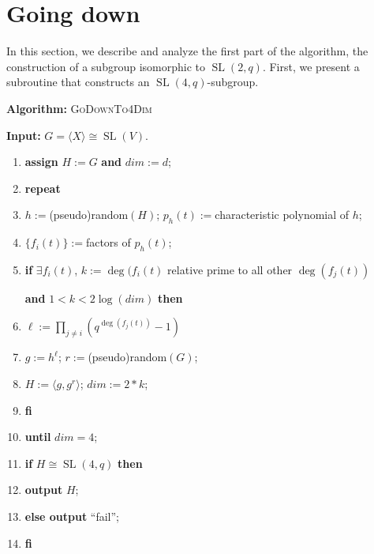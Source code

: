 \documentclass[a4paper,11pt]{article}
\def\SL{\operatorname{SL}}
\renewcommand{\bf}{\textbf} \renewcommand{\L}{\Lambda}
\begin{document}
\section{Going down}
\label{going down}

In this section, we describe and analyze the first part of the algorithm, the construction of a subgroup isomorphic to $\SL(2,q)$. First, we present a subroutine that constructs an $\SL(4,q)$-subgroup.

\medskip\noindent
{\bf {Algorithm:}} \textsc{GoDownTo4Dim}

\noindent
{\bf {Input:}} $G = \langle X \rangle \cong \SL(V)$.
\begin{enumerate}
\item {\bf {assign}} $H := G$ {\bf {and}} $dim := d$;
\item {\bf {repeat}} 
\item \hspace*{1cm} $h:=$(pseudo)random$(H)$; $p_h(t):=$characteristic polynomial of $h$; 
\item \hspace*{1cm} $\{ f_i(t) \}:=$factors of $p_h(t)$;
\item \hspace*{1cm} {\bf {if}} $\exists f_i(t)$, $k:=\deg(f_i(t)$ relative prime
to all other $\deg(f_j(t))$ 

 \hspace*{2cm} {\bf {and}} $1<k<2 \log(dim)$ {\bf {then}}
\item \hspace*{2cm} $\ell:=\prod_{j \ne i} \left(q^{\deg(f_j(t))}-1\right)$
\item \hspace*{2cm} $g:=h^{\ell}$; $r:=$(pseudo)random$(G)$;
\item \hspace*{2cm} $H:=\langle g,g^r \rangle$; $dim := 2*k$;
\item \hspace*{1cm} {\bf {fi}}
\item {\bf {until}} $dim=4$;
\item {\bf {if}} $H \cong \SL(4,q)$ {\bf {then}}
\item \hspace*{1cm} {\bf {output}} $H$;
\item \hspace*{1cm} {\bf {else output}} ``fail'';
\item {\bf {fi}}
\end{enumerate}
\end{document}
